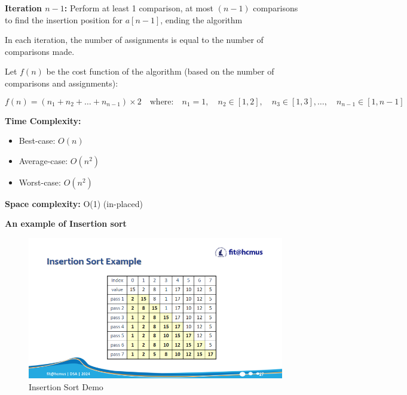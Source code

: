 \textbf{Iteration $n - 1$:} Perform at least 1 comparison, at most $(n - 1)$ comparisons to find the insertion position for $a[n - 1]$, ending the algorithm

In each iteration, the number of assignments is equal to the number of comparisons made.

Let $f(n)$ be the cost function of the algorithm (based on the number of comparisons and assignments):

\[
f(n) = (n_1 + n_2 + \ldots + n_{n-1}) \times 2 \quad \text{where:} \quad n_1 = 1, \quad n_2 \in [1, 2], \quad n_3 \in [1, 3], \ldots, \quad n_{n-1} \in [1, n - 1]
\]

\textbf{Time Complexity:}
\begin{itemize}
    \item Best-case: $O(n)$
    \item Average-case: $O(n^2)$
    \item Worst-case: $O(n^2)$
\end{itemize}
\textbf{Space complexity:} O(1) (in-placed)

\vspace{5pt}

\textbf{An example of Insertion sort} ~\cite{ref1}

\begin{figure}[h]
    \centering
    \includegraphics[scale=.40]{Figures/sort_demo/insertion.png}
    \caption{Insertion Sort Demo}
    \label{fig:enter-label}
\end{figure}